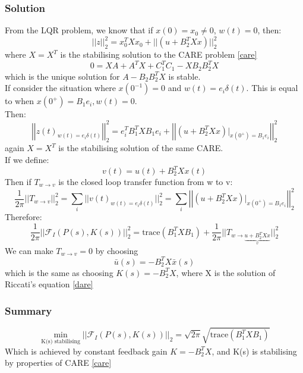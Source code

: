 \documentclass{article}
\begin{document}
\subsubsection*{Solution}
From the LQR problem, we know that if $x(0)=x_0 \neq 0$, $w(t) = 0$, then:
\[
||z||_2^2 = x_0^TXx_0 + ||(u+B_2^TXx)||_2^2
\]
where $X = X^T$ is the stabilising solution to the CARE problem \eqref{care}
\[
0 = XA+A^TX +C_1^TC_1 - XB_2B_2^TX
\]
which is the unique solution for $A-B_2B_2^TX$ is stable. \\
If consider the situation where $x(0^{-1}) = 0$ and $w(t) = e_i \delta (t)$. This is equal to when $x(0^+) = B_1e_i, w(t) = 0$.  \\ Then:
\[
\left| \left| z(t)_{w(t) = e_i \delta(t)} \right| \right|_2^2 = e_i^TB_1^TXB_1e_i + \left| \left| (u+B_2^TXx)|_{x(0^+) = B_1 e_i} \right| \right|_2^2
\]
again $X=X^T$ is the stabilising solution of the same CARE. \\
If we define:
\[
v(t) = u(t) + B_2^T Xx(t)
\]
Then if $T_{w \rightarrow v}$ is the closed loop transfer function from w to v:
\[
\frac{1}{2\pi} ||T_{w \rightarrow v}||_2^2 = \sum_i ||v(t)_{w(t) = e_i \delta(t)}||_2^2 = \sum_i\left| \left| (u+B_2^TXx)|_{x(0^+) = B_1 e_i} \right| \right|_2^2
\]
Therefore:
\[
\frac{1}{2 \pi} ||\mathcal{F}_I(P(s),K(s))||_2^2 = \text{trace}(B_1^TXB_1) + \frac{1}{2 \pi}|| T_{w \rightarrow \underbrace{u + B_2^TXx}_{v}}||_2^2
\]
We can make $T_{w \rightarrow v} = 0$ by choosing 
\[
\bar u (s) = -B_2^T X \bar x(s)
\]
which is the same as choosing $K(s) = -B_2^T X$, where X is the solution of Riccati's equation \eqref{dare}
\subsubsection*{Summary}
\[
\min_{\text{K(s) stabilising}} ||\mathcal{F}_I(P(s),K(s))||_2 = \sqrt{2 \pi} \sqrt{\text{trace}(B_1^TXB_1)}
\]
Which is achieved by constant feedback gain $K = -B_2^TX$, and K(s) is stabilising by properties of CARE \eqref{care}
\end{document}
